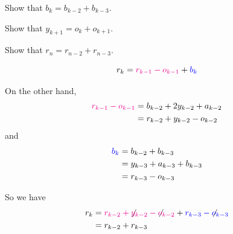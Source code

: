 	\begin{parts}
		\item Show that $b_k=b_{k-2}+b_{k-3}$.
		\item Show that $y_{k+1}=o_{k}+o_{k+1}$.
		\item Show that $r_{n} = r_{n-2}+r_{n-3}$.
	\end{parts}

\begin{annotation}
\begin{goals}
$$
r_k 
	= {\color{magenta}r_{k-1}-o_{k-1}}+{\color{blue}b_k}
$$

On the other hand, 
\begin{align*}
\color{magenta}
r_{k-1}-o_{k-1}
  & = b_{k-2} + 2 y_{k-2} + a_{k-2}  \\
  & = r_{k-2} + y_{k-2} - o_{k-2}
\end{align*}
and
\begin{align*}
\color{blue}
b_k 
  & = b_{k-2}+b_{k-3} \\
  & = y_{k-3} + a_{k-3} + b_{k-3} \\
  & = r_{k-3} - o_{k-3}	
\end{align*}


So we have
\begin{align*}
r_k & = {\color{magenta}r_{k-2} + {\color{black}\not} y_{k-2} - {\color{black}\not} o_{k-2}} + {\color{blue}r_{k-3} - {\color{black}\not}o_{k-3}} \\
& = r_{k-2} + r_{k-3}
\end{align*}

\end{goals}
\end{annotation}	

	
	

\standardonlynewpage

%
%
%
%
%
%
%	
%	
%
%
%
%
%	
%
%
%
%
%
%
%
%
%

